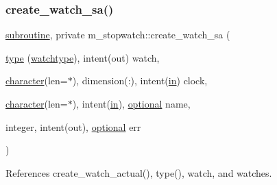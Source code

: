 \subsubsection{\texorpdfstring{create\+\_\+watch\+\_\+sa()}{create\_watch\_sa()}}
{\footnotesize\ttfamily \hyperlink{M__stopwatch_83_8txt_acfbcff50169d691ff02d4a123ed70482}{subroutine}, private m\+\_\+stopwatch\+::create\+\_\+watch\+\_\+sa (\begin{DoxyParamCaption}\item[{\hyperlink{stop__watch_83_8txt_a70f0ead91c32e25323c03265aa302c1c}{type} (\hyperlink{structm__stopwatch_1_1watchtype}{watchtype}), intent(out)}]{watch,  }\item[{\hyperlink{option__stopwatch_83_8txt_abd4b21fbbd175834027b5224bfe97e66}{character}(len=$\ast$), dimension(\+:), intent(\hyperlink{M__journal_83_8txt_afce72651d1eed785a2132bee863b2f38}{in})}]{clock,  }\item[{\hyperlink{option__stopwatch_83_8txt_abd4b21fbbd175834027b5224bfe97e66}{character}(len=$\ast$), intent(\hyperlink{M__journal_83_8txt_afce72651d1eed785a2132bee863b2f38}{in}), \hyperlink{option__stopwatch_83_8txt_aa4ece75e7acf58a4843f70fe18c3ade5}{optional}}]{name,  }\item[{integer, intent(out), \hyperlink{option__stopwatch_83_8txt_aa4ece75e7acf58a4843f70fe18c3ade5}{optional}}]{err }\end{DoxyParamCaption})\hspace{0.3cm}{\ttfamily [private]}}



References create\+\_\+watch\+\_\+actual(), type(), watch, and watches.

\mbox{\label{namespacem__stopwatch_a189c66a0795f7cfe9b1f2d2be3248f2c}} 

